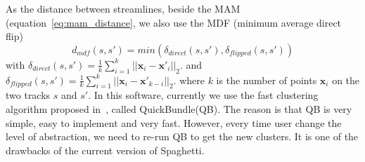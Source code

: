 As the distance between streamlines, beside the MAM (equation~\ref{eq:mam_distance}, we also use the MDF (minimum average direct flip)
\begin{equation}
\label{eq:mdf_distance}
	d_{mdf}(s,s') = min(\delta_{direct}(s,s'),\delta_{flipped}(s,s'))
\end{equation}
with $\delta_{direct}(s,s') = \frac{1}{k} \sum_{i=1}^{k} 
	||\mathbf{x}_{i} - \mathbf{x'}_i||_2.$
and $\delta_{flipped}(s,s') = \frac{1}{k} \sum_{i=1}^{k} 
	||\mathbf{x}_{i} - \mathbf{x'}_{k-i}||_2.$
where $k$ is the number of points $\mathbf{x}_{i}$ on the two tracks $s$ and $s'$.
In this software, currently we use the fast clustering algorithm proposed in~\cite{garyfallidis2012quickbundles}, called QuickBundle(QB). The reason is that QB is very simple, easy to implement and very fast. However, every time user change the level of abstraction, we need to re-run QB to get the new clusters. It is one of the drawbacks of the current version of Spaghetti.

